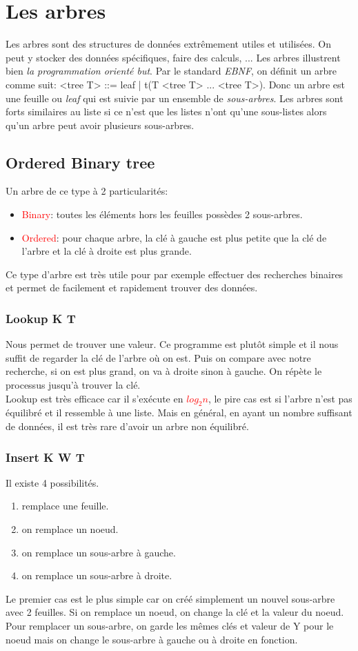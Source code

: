 \documentclass{report}
\begin{document}
\section{Les arbres}
Les arbres sont des structures de données extrêmement utiles et utilisées. On peut y stocker des données spécifiques, faire des calculs, ... Les arbres illustrent bien \textit{la programmation orienté but}. Par le standard \textit{EBNF}, on définit un arbre comme suit: <tree T> ::= leaf | t(T <tree T> ... <tree T>). Donc un arbre est une feuille ou \textit{leaf} qui est suivie par un ensemble de \textit{sous-arbres}. Les arbres sont forts similaires au liste si ce n'est que les listes n'ont qu'une sous-listes alors qu'un arbre peut avoir plusieurs sous-arbres.

\subsection{Ordered Binary tree}
Un arbre de ce type à 2 particularités:
\begin{itemize}
\item \textcolor{red}{Binary}: toutes les éléments hors les feuilles possèdes 2 sous-arbres.
\item \textcolor{red}{Ordered}: pour chaque arbre, la clé à gauche est plus petite que la clé de l'arbre et la clé à droite est plus grande.
\end{itemize}
Ce type d'arbre est très utile pour par exemple effectuer des recherches binaires et permet de facilement et rapidement trouver des données.

\subsubsection{Lookup K T}
Nous permet de trouver une valeur. Ce programme est plutôt simple et il nous suffit de regarder la clé de l'arbre où on est. Puis on compare avec notre recherche, si on est plus grand, on va à droite sinon à gauche. On répète le processus jusqu'à trouver la clé.\\
Lookup est très efficace car il s'exécute en \textcolor{red}{$log_2 n$}, le pire cas est si l'arbre n'est pas équilibré et il ressemble à une liste. Mais en général, en ayant un nombre suffisant de données, il est très rare d'avoir un arbre non équilibré.
\subsubsection{Insert K W T}
Il existe 4 possibilités.
\begin{enumerate}
\item remplace une feuille.
\item on remplace un noeud.
\item on remplace un sous-arbre à gauche.
\item on remplace un sous-arbre à droite.
\end{enumerate}
Le premier cas est le plus simple car on créé simplement un nouvel sous-arbre avec 2 feuilles. Si on remplace un noeud, on change la clé et la valeur du noeud.
Pour remplacer un sous-arbre, on garde les mêmes clés et valeur de Y pour le noeud mais on change le sous-arbre à gauche ou à droite en fonction.
\end{document}
